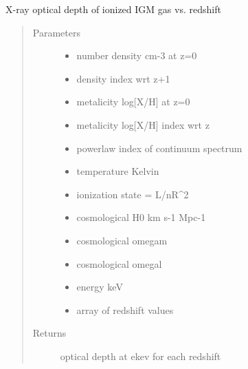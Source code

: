 \documentclass[letterpaper,10pt,english]{sphinxmanual}
\begin{document}

\begin{fulllineitems}
\label{\detokenize{astro_functions:astro.iigmtauvz}}
X-ray optical depth of ionized IGM gas vs. redshift
\begin{quote}\begin{description}
\item[{Parameters}] \leavevmode\begin{itemize}
\item {} 
 \textendash{} number density cm-3 at z=0

\item {} 
 \textendash{} density index wrt z+1

\item {} 
 \textendash{} metalicity log{[}X/H{]} at z=0

\item {} 
 \textendash{} metalicity log{[}X/H{]} index wrt z

\item {} 
 \textendash{} powerlaw index of continuum spectrum

\item {} 
 \textendash{} temperature Kelvin

\item {} 
 \textendash{} ionization state = L/nR\textasciicircum{}2

\item {} 
 \textendash{} cosmological H0 km s-1 Mpc-1

\item {} 
 \textendash{} cosmological omegam

\item {} 
 \textendash{} cosmological omegal

\item {} 
 \textendash{} energy keV

\item {} 
 \textendash{} array of redshift values

\end{itemize}

\item[{Returns}] \leavevmode
optical depth at ekev for each redshift

\end{description}\end{quote}

\end{fulllineitems}
\end{document}
